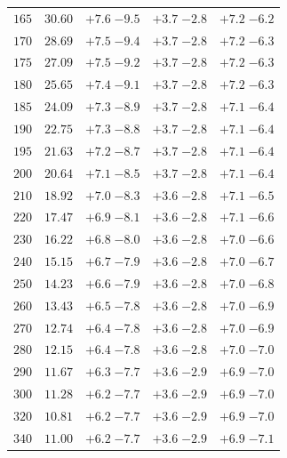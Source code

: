 \begin{table}
\begin{center}
\begin{tabular}{ccccc}
 $165 $&$ 30.60 $& $ {+ 7.6}  \;{- 9.5} $ & $ {+ 3.7}  \;{- 2.8} $ & $ {+ 7.2}  \;{- 6.2} $ \\
 $170 $&$ 28.69 $& $ {+ 7.5}  \;{- 9.4} $ & $ {+ 3.7}  \;{- 2.8} $ & $ {+ 7.2}  \;{- 6.3} $ \\
 $175 $&$ 27.09 $& $ {+ 7.5}  \;{- 9.2} $ & $ {+ 3.7}  \;{- 2.8} $ & $ {+ 7.2}  \;{- 6.3} $ \\
 $180 $&$ 25.65 $& $ {+ 7.4}  \;{- 9.1} $ & $ {+ 3.7}  \;{- 2.8} $ & $ {+ 7.2}  \;{- 6.3} $ \\
 $185 $&$ 24.09 $& $ {+ 7.3}  \;{- 8.9} $ & $ {+ 3.7}  \;{- 2.8} $ & $ {+ 7.1}  \;{- 6.4} $ \\
 $190 $&$ 22.75 $& $ {+ 7.3}  \;{- 8.8} $ & $ {+ 3.7}  \;{- 2.8} $ & $ {+ 7.1}  \;{- 6.4} $ \\
 $195 $&$ 21.63 $& $ {+ 7.2}  \;{- 8.7} $ & $ {+ 3.7}  \;{- 2.8} $ & $ {+ 7.1}  \;{- 6.4} $ \\
 $200 $&$ 20.64 $& $ {+ 7.1}  \;{- 8.5} $ & $ {+ 3.7}  \;{- 2.8} $ & $ {+ 7.1}  \;{- 6.4} $ \\
 $210 $&$ 18.92 $& $ {+ 7.0}  \;{- 8.3} $ & $ {+ 3.6}  \;{- 2.8} $ & $ {+ 7.1}  \;{- 6.5} $ \\
 $220 $&$ 17.47 $& $ {+ 6.9}  \;{- 8.1} $ & $ {+ 3.6}  \;{- 2.8} $ & $ {+ 7.1}  \;{- 6.6} $ \\
 $230 $&$ 16.22 $& $ {+ 6.8}  \;{- 8.0} $ & $ {+ 3.6}  \;{- 2.8} $ & $ {+ 7.0}  \;{- 6.6} $ \\
 $240 $&$ 15.15 $& $ {+ 6.7}  \;{- 7.9} $ & $ {+ 3.6}  \;{- 2.8} $ & $ {+ 7.0}  \;{- 6.7} $ \\
 $250 $&$ 14.23 $& $ {+ 6.6}  \;{- 7.9} $ & $ {+ 3.6}  \;{- 2.8} $ & $ {+ 7.0}  \;{- 6.8} $ \\
 $260 $&$ 13.43 $& $ {+ 6.5}  \;{- 7.8} $ & $ {+ 3.6}  \;{- 2.8} $ & $ {+ 7.0}  \;{- 6.9} $ \\
 $270 $&$ 12.74 $& $ {+ 6.4}  \;{- 7.8} $ & $ {+ 3.6}  \;{- 2.8} $ & $ {+ 7.0}  \;{- 6.9} $ \\
 $280 $&$ 12.15 $& $ {+ 6.4}  \;{- 7.8} $ & $ {+ 3.6}  \;{- 2.8} $ & $ {+ 7.0}  \;{- 7.0} $ \\
 $290 $&$ 11.67 $& $ {+ 6.3}  \;{- 7.7} $ & $ {+ 3.6}  \;{- 2.9} $ & $ {+ 6.9}  \;{- 7.0} $ \\
 $300 $&$ 11.28 $& $ {+ 6.2}  \;{- 7.7} $ & $ {+ 3.6}  \;{- 2.9} $ & $ {+ 6.9}  \;{- 7.0} $ \\
 $320 $&$ 10.81 $& $ {+ 6.2}  \;{- 7.7} $ & $ {+ 3.6}  \;{- 2.9} $ & $ {+ 6.9}  \;{- 7.0} $ \\
 $340 $&$ 11.00 $& $ {+ 6.2}  \;{- 7.7} $ & $ {+ 3.6}  \;{- 2.9} $ & $ {+ 6.9}  \;{- 7.1} $ \\

\end{tabular}
\end{center}
\end{table}

